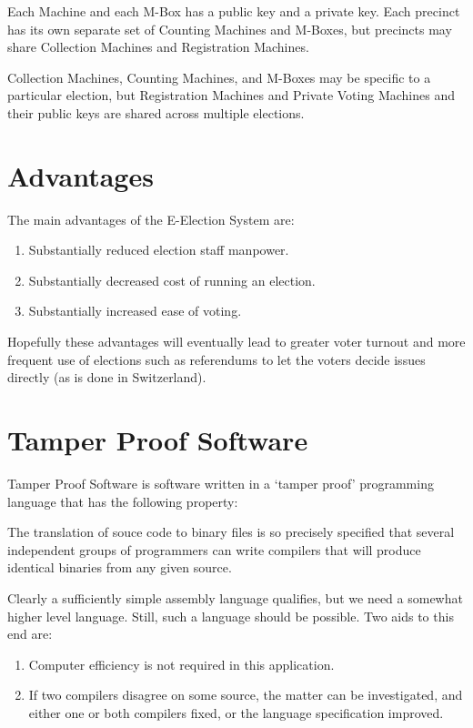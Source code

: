\documentclass[12pt]{article}
\newenvironment{indpar}[1][0.3in]%
	{\begin{list}{}%
		     {\setlength{\itemsep}{0in}%
		      \setlength{\topsep}{0in}%
		      \setlength{\parsep}{1ex}%
		      \setlength{\labelwidth}{#1}%
		      \setlength{\leftmargin}{#1}%
		      \addtolength{\leftmargin}{\labelsep}}%
	 \item}%
	{\end{list}}
\begin{document}
Each Machine and each M-Box has a public key and a private key.
Each precinct has its own separate set of Counting Machines and M-Boxes,
but precincts may share Collection Machines and Registration
Machines.

Collection Machines,
Counting Machines, and M-Boxes may be
specific to a particular election, but Registration Machines
and Private Voting Machines and
their public keys are shared across multiple elections.

\section{Advantages}

The main advantages of the E-Election System are:
\begin{enumerate}
\item Substantially reduced election staff manpower.
\item Substantially decreased cost of running an election.
\item Substantially increased ease of voting.
\end{enumerate}

Hopefully these advantages will eventually lead to
greater voter turnout and more frequent use of elections such
as referendums to let the voters decide issues directly
(as is done in Switzerland).


\section{Tamper Proof Software}

Tamper Proof Software is software written in a `tamper proof'
programming language
that has the following property:
\begin{indpar}
The translation of souce code to binary files is so precisely
specified that several independent groups of programmers can
write compilers that will produce identical binaries from any
given source.
\end{indpar}

Clearly a sufficiently simple assembly language qualifies, but
we need a somewhat higher level language.  Still, such a language
should be possible.  Two aids to this end are:
\begin{enumerate}
\item
Computer efficiency is not required in this application.

\item
If two compilers disagree on some source, the matter can be
investigated, and either one or both compilers fixed, or the
language specification improved.
\end{enumerate}
\end{document}
